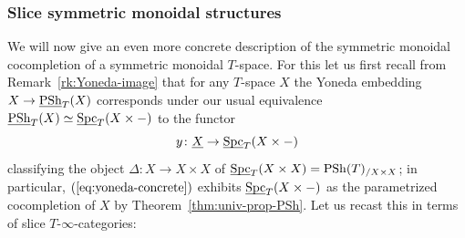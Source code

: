 \documentclass[reqno]{memo-l}
\theoremstyle{mythm}
\theoremstyle{definition}
\numberwithin{equation}{section}
\DeclareMathOperator{\Spc}{Spc}
\DeclareMathOperator{\PSh}{PSh}
\newcommand{\ulhelper}[2]{\underline{\setbox0=\hbox{$#1#2$}\dp0=0.4pt \box0\relax}}
\newcommand{\ul}[1]{{\mathpalette\ulhelper{#1}}\hbox{\rule[-2pt]{0pt}{0pt}}}
\begin{document}
\subsubsection{Slice symmetric monoidal structures} We will now give an even more concrete description of the symmetric monoidal cocompletion of a symmetric monoidal $T$-space. For this let us first recall from Remark~\ref{rk:Yoneda-image} that for any $T$-space $X$ the Yoneda embedding $X\to\ul\PSh_T(X)$ corresponds under our usual equivalence $\ul\PSh_T(X)\simeq\ul\Spc_T(X\times{-})$ to the functor 
\begin{equation}\label{eq:yoneda-concrete}
    y\colon\ul X\to\ul\Spc_T(X\times {-})
\end{equation} 
classifying the object $\Delta\colon X\to X\times X$ of $\ul\Spc_T(X\times X)=\PSh(T)_{/X\times X}$; in particular, $(\ref{eq:yoneda-concrete})$ exhibits $\ul\Spc_T(X\times{-})$ as the parametrized cocompletion of $X$ by Theorem~\ref{thm:univ-prop-PSh}. Let us recast this in terms of slice $T$-$\infty$-categories:
\end{document}
